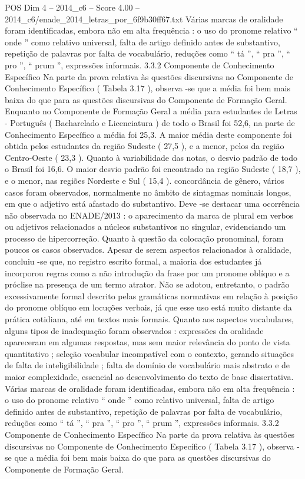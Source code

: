 \begin{textsample}{POS Dim 4 – 2014\_c6 – Score 4.00 – 2014\_c6/enade\_2014\_letras\_por\_6f9b30ff67.txt}
Várias marcas de oralidade foram identificadas, embora não em alta frequência : o uso do pronome relativo “ onde ” como relativo universal, falta de artigo definido antes de substantivo, repetição de palavras por falta de vocabulário, reduções como “ tá ”, “ pra ”, “ pro ”, “ prum ”, expressões informais. 3.3.2 Componente de Conhecimento Específico Na parte da prova relativa às questões discursivas no Componente de Conhecimento Específico ( Tabela 3.17 ), observa -se que a média foi bem mais baixa do que para as questões discursivas do Componente de Formação Geral.
Enquanto no Componente de Formação Geral a média para estudantes de Letras - Português ( Bacharelado e Licenciatura ) de todo o Brasil foi 52,6, na parte de Conhecimento Específico a média foi 25,3.
A maior média deste componente foi obtida pelos estudantes da região Sudeste ( 27,5 ), e a menor, pelos da região Centro-Oeste ( 23,3 ).
Quanto à variabilidade das notas, o desvio padrão de todo o Brasil foi 16,6.
O maior desvio padrão foi encontrado na região Sudeste ( 18,7 ), e o menor, nas regiões Nordeste e Sul ( 15,4 ). concordância de gênero, vários casos foram observados, normalmente no âmbito de sintagmas nominais longos, em que o adjetivo está afastado do substantivo.
Deve -se destacar uma ocorrência não observada no ENADE/2013 : o aparecimento da marca de plural em verbos ou adjetivos relacionados a núcleos substantivos no singular, evidenciando um processo de hipercorreção.
Quanto à questão da colocação pronominal, foram poucos os casos observados.
Apesar de serem aspectos relacionados à oralidade, concluiu -se que, no registro escrito formal, a maioria dos estudantes já incorporou regras como a não introdução da frase por um pronome oblíquo e a próclise na presença de um termo atrator.
Não se adotou, entretanto, o padrão excessivamente formal descrito pelas gramáticas normativas em relação à posição do pronome oblíquo em locuções verbais, já que esse uso está muito distante da prática cotidiana, até em textos mais formais.
Quanto aos aspectos vocabulares, alguns tipos de inadequação foram observados : expressões da oralidade apareceram em algumas respostas, mas sem maior relevância do ponto de vista quantitativo ; seleção vocabular incompatível com o contexto, gerando situações de falta de inteligibilidade ; falta de domínio de vocabulário mais abstrato e de maior complexidade, essencial ao desenvolvimento do texto de base dissertativa.
Várias marcas de oralidade foram identificadas, embora não em alta frequência : o uso do pronome relativo “ onde ” como relativo universal, falta de artigo definido antes de substantivo, repetição de palavras por falta de vocabulário, reduções como “ tá ”, “ pra ”, “ pro ”, “ prum ”, expressões informais. 3.3.2 Componente de Conhecimento Específico Na parte da prova relativa às questões discursivas no Componente de Conhecimento Específico ( Tabela 3.17 ), observa -se que a média foi bem mais baixa do que para as questões discursivas do Componente de Formação Geral.

\end{textsample}
